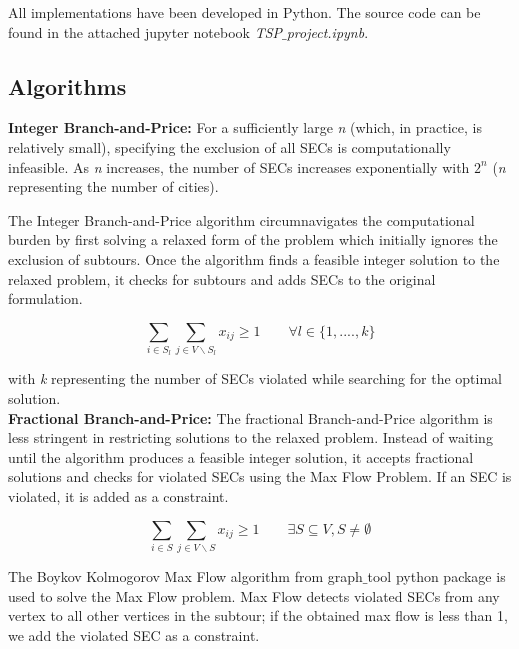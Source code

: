 \documentclass[12pt]{article}
\numberwithin{equation}{section}
\begin{document}
All implementations have been developed in Python. The source code can be found in the attached jupyter notebook \textit{TSP$\_$project.ipynb}.

\vspace{1em} 

\subsection{Algorithms}

\textbf{Integer Branch-and-Price:} For a sufficiently large \textit{n} (which, in practice, is relatively small), specifying the exclusion of all SECs is computationally infeasible. As \textit{n} increases, the number of SECs increases exponentially with $2^n$ (\textit{n} representing the number of cities).

The Integer Branch-and-Price algorithm circumnavigates the computational burden by first solving a relaxed form of the problem which initially ignores the exclusion of subtours. Once the algorithm finds a feasible integer solution to the relaxed problem, it checks for subtours and adds SECs to the original formulation. 

\begin{equation}
\sum_{i \in S_l} \sum_{j \in V \backslash S_l} x_{ij} \geq 1 \quad \quad \forall l \in \{1, ...., k \}
\end{equation}

with \textit{k} representing the number of SECs violated while searching for the optimal solution.\\

\noindent\textbf{Fractional Branch-and-Price:} The fractional Branch-and-Price algorithm is less stringent in restricting solutions to the relaxed problem. Instead of waiting until the algorithm produces a feasible integer solution, it accepts fractional solutions and checks for violated SECs using the Max Flow Problem. If an SEC is violated, it is added as a constraint.

\begin{equation}
\sum_{i \in S} \sum_{j \in V \backslash S} x_{ij} \ge 1 \quad \quad \exists S  \subseteq V , S  \ne \emptyset 
\end{equation}

The Boykov Kolmogorov Max Flow algorithm from graph$\_$tool python package is used to solve the Max Flow problem. Max Flow detects violated SECs from any vertex to all other vertices in the subtour; if the obtained max flow is less than 1, we add the violated SEC as a constraint.
\end{document}

